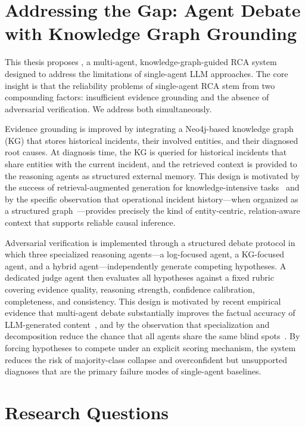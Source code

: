 \section{Addressing the Gap: Agent Debate with Knowledge Graph Grounding}

This thesis proposes \systemname{}, a multi-agent, knowledge-graph-guided RCA system designed
to address the limitations of single-agent LLM approaches. The core insight is that the
reliability problems of single-agent RCA stem from two compounding factors: insufficient
evidence grounding and the absence of adversarial verification. We address both simultaneously.

Evidence grounding is improved by integrating a Neo4j-based knowledge graph (KG) that stores
historical incidents, their involved entities, and their diagnosed root causes. At diagnosis time,
the KG is queried for historical incidents that share entities with the current incident, and the
retrieved context is provided to the reasoning agents as structured external memory. This design
is motivated by the success of retrieval-augmented generation for knowledge-intensive
tasks~\cite{lewis2021retrievalaugmentedgenerationknowledgeintensivenlp} and by the specific
observation that operational incident history---when organized as a structured
graph~\cite{hogan2021knowledge}---provides precisely the kind of entity-centric, relation-aware
context that supports reliable causal inference.

Adversarial verification is implemented through a structured debate protocol in which three
specialized reasoning agents---a log-focused agent, a KG-focused agent, and a hybrid
agent---independently generate competing hypotheses. A dedicated judge agent then evaluates all
hypotheses against a fixed rubric covering evidence quality, reasoning strength, confidence
calibration, completeness, and consistency. This design is motivated by recent empirical evidence
that multi-agent debate substantially improves the factual accuracy of LLM-generated
content~\cite{du2023improvingfactualityreasoninglanguage}, and by the observation that
specialization and decomposition reduce the chance that all agents share the same blind
spots~\cite{wu2023autogen}. By forcing hypotheses to compete under an explicit scoring
mechanism, the system reduces the risk of majority-class collapse and overconfident but
unsupported diagnoses that are the primary failure modes of single-agent baselines.

\section{Research Questions}

